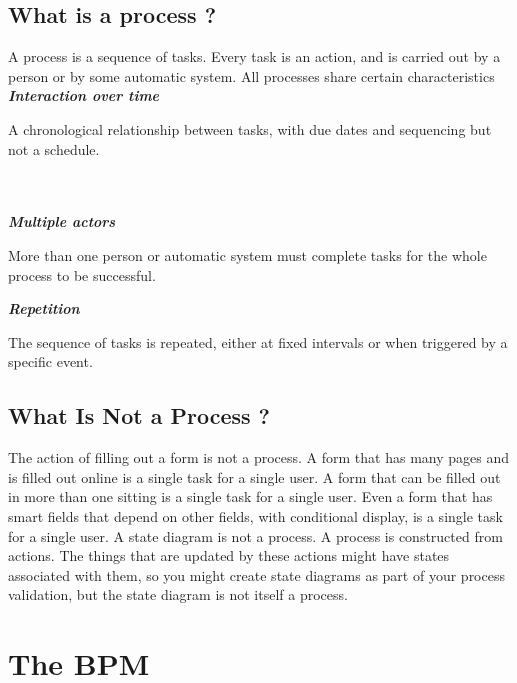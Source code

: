 \section{What is a process ?}
A process is a sequence of tasks. Every task is an action, and is carried out by a person
or by some automatic system. All processes share certain characteristics\\

\textbf{\textit{Interaction over time}}
\begin{adjustwidth}{2cm}{}
    A chronological relationship between tasks, with due dates and sequencing but
not a schedule.\\\\\\
\end{adjustwidth}
\textbf{\textit{Multiple actors}}
\begin{adjustwidth}{2cm}{}
    More than one person or automatic system must complete tasks for the whole
process to be successful.\\
\end{adjustwidth}
\textbf{\textit{Repetition}}
\begin{adjustwidth}{2cm}{}
    The sequence of tasks is repeated, either at fixed intervals or when triggered by a
specific event.
\end{adjustwidth}

\section{What Is Not a Process ?}
The action of filling out a form is not a process. A form that has many pages and is
filled out online is a single task for a single user. A form that can be filled out in more
than one sitting is a single task for a single user. Even a form that has smart fields that
depend on other fields, with conditional display, is a single task for a single user.
A state diagram is not a process. A process is constructed from actions. The things
that are updated by these actions might have states associated with them, so you
might create state diagrams as part of your process validation, but the state diagram is
not itself a process.

\chapter{The BPM}

